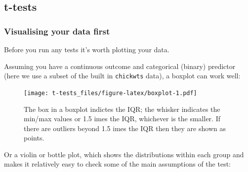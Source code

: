\documentclass[]{article}
\newenvironment{Shaded}{\begin{snugshade}}{\end{snugshade}}
\newcommand{\KeywordTok}[1]{\textcolor[rgb]{0.13,0.29,0.53}{\textbf{#1}}}
\newcommand{\StringTok}[1]{\textcolor[rgb]{0.31,0.60,0.02}{#1}}
\newcommand{\OperatorTok}[1]{\textcolor[rgb]{0.81,0.36,0.00}{\textbf{#1}}}
\newcommand{\NormalTok}[1]{#1}
\theoremstyle{definition}
\theoremstyle{definition}
\theoremstyle{definition}
\theoremstyle{remark}
\begin{document}
\hypertarget{t-tests}{\subsection*{t-tests}\label{t-tests}}

\subsubsection*{Visualising your data
first}\label{visualising-your-data-first}

Before you run any tests it's worth plotting your data.

Assuming you have a continuous outcome and categorical (binary)
predictor (here we use a subset of the built in \texttt{chickwts} data),
a boxplot can work well:

\begin{Shaded}
\end{Shaded}

\begin{figure}
\centering
\texttt{[image: t-tests\_files/figure-latex/boxplot-1.pdf]}
\caption{\label{fig:boxplot}The box in a boxplot indictes the IQR; the
whisker indicates the min/max values or 1.5 imes the IQR, whichever is
the smaller. If there are outliers beyond 1.5 imes the IQR then they are
shown as points.}
\end{figure}

Or a violin or bottle plot, which shows the distributions within each
group and makes it relatively easy to check some of the main assumptions
of the test:

\begin{Shaded}
\end{Shaded}
\end{document}
